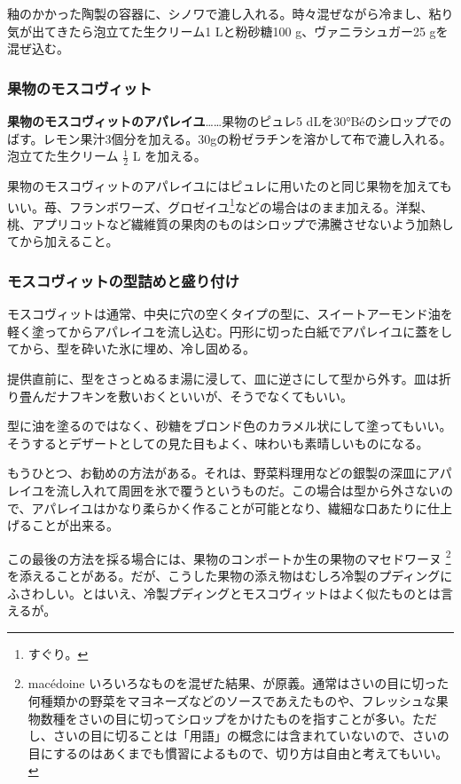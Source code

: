 釉のかかった陶製の容器に、シノワで漉し入れる。時々混ぜながら冷まし、粘り気が出てきたら泡立てた生クリーム1
Lと粉砂糖100 g、ヴァニラシュガー25 gを混ぜ込む。

\hypertarget{moscovite-aux-fruits}{%
\subsubsection{果物のモスコヴィット}\label{moscovite-aux-fruits}}

\textbf{果物のモスコヴィットのアパレイユ}\ldots{}\ldots{}果物のピュレ5
dLを30°Béのシロップでのばす。レモン果汁3個分を加える。30gの粉ゼラチンを溶かして布で漉し入れる。泡立てた生クリーム
\(\frac{1}{2}\) L を加える。

果物のモスコヴィットのアパレイユにはピュレに用いたのと同じ果物を加えてもいい。苺、フランボワーズ、グロゼイユ\footnote{すぐり。}などの場合はのまま加える。洋梨、桃、アプリコットなど繊維質の果肉のものはシロップで沸騰させないよう加熱してから加えること。

\hypertarget{moulage-et-dressage-des-moscovites}{%
\subsubsection{モスコヴィットの型詰めと盛り付け}\label{moulage-et-dressage-des-moscovites}}

モスコヴィットは通常、中央に穴の空くタイプの型に、スイートアーモンド油を軽く塗ってからアパレイユを流し込む。円形に切った白紙でアパレイユに蓋をしてから、型を砕いた氷に埋め、冷し固める。

提供直前に、型をさっとぬるま湯に浸して、皿に逆さにして型から外す。皿は折り畳んだナフキンを敷いおくといいが、そうでなくてもいい。

型に油を塗るのではなく、砂糖をブロンド色のカラメル状にして塗ってもいい。そうするとデザートとしての見た目もよく、味わいも素晴しいものになる。

もうひとつ、お勧めの方法がある。それは、野菜料理用などの銀製の深皿にアパレイユを流し入れて周囲を氷で覆うというものだ。この場合は型から外さないので、アパレイユはかなり柔らかく作ることが可能となり、繊細な口あたりに仕上げることが出来る。

この最後の方法を採る場合には、果物のコンポートか生の果物のマセドワーヌ
\footnote{macédoine
  いろいろなものを混ぜた結果、が原義。通常はさいの目に切った何種類かの野菜をマヨネーズなどのソースであえたものや、フレッシュな果物数種をさいの目に切ってシロップをかけたものを指すことが多い。ただし、さいの目に切ることは「用語」の概念には含まれていないので、さいの目にするのはあくまでも慣習によるもので、切り方は自由と考えてもいい。}を添えることがある。だが、こうした果物の添え物はむしろ冷製のプディングにふさわしい。とはいえ、冷製プディングとモスコヴィットはよく似たものとは言えるが。

